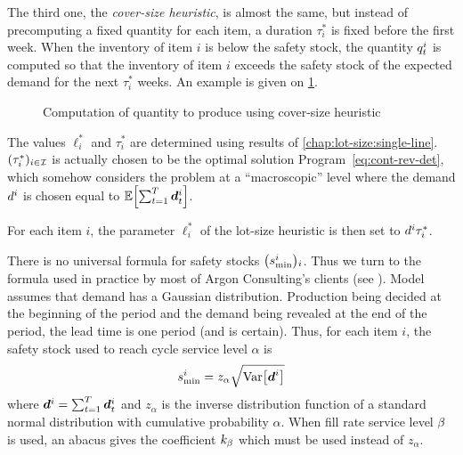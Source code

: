 
The third one, the {\em cover-size heuristic}, is almost the same, but instead of precomputing a fixed quantity for each item, a duration $\tau_i^*$ is fixed before the first week.
When the inventory of item $i$ is below the safety stock, the quantity $q_t^i$ is computed so that the inventory of item $i$ exceeds the safety stock of the expected demand for the next $\tau_i^*$ weeks.
An example is given on \cref{fig:cover-size-production}.

\begin{figure}[h]
  \centering
  \caption{Computation of quantity to produce using cover-size heuristic}
  \label{fig:cover-size-production}
\end{figure}


The values $\ell_i^*$ and $\tau_i^*$ are determined using results of \cref{chap:lot-size:single-line}.
$(\tau_i^*)_{i\in\mathcal{I}}$ is actually chosen to be the optimal solution Program~\eqref{eq:cont-rev-det}, which somehow considers the problem at a ``macroscopic'' level
where the demand $d^i$ is chosen equal to $\espe\sqbracket{\sum_{t=1}^{\horizon}\va d_t^i}$.

For each item $i$, the parameter $\ell_i^*$ of the lot-size heuristic is then set to $d^i\tau_i^*$.

There is no universal formula for safety stocks $\bracket{\safety^i}_i$.
Thus we turn to the formula used in practice by most of Argon Consulting's clients (see \cite[Chapter 11]{arnold2007}).
Model assumes that demand has a Gaussian distribution.
Production being decided at the beginning of the period and the demand being revealed at the end of the period, the lead time is one period (and is certain).
Thus, for each item $i$, the safety stock used to reach cycle service level $\alpha$ is
\begin{equation}\label{eq:PDP:numerical-experiments:safety-stock}
  \safety^i = z_{\alpha} \sqrt{\vari\sqbracket{\va\demand^i}}
\end{equation}
where $\va\demand^i=\sum_{t=1}^{\horizon}\va\demand_t^i$ and $z_{\alpha}$ is the inverse distribution function of a standard normal distribution with cumulative probability $\alpha$.
When fill rate service level $\beta$ is used, an abacus gives the coefficient $k_{\beta}$ which must be used instead of $z_{\alpha}$.


